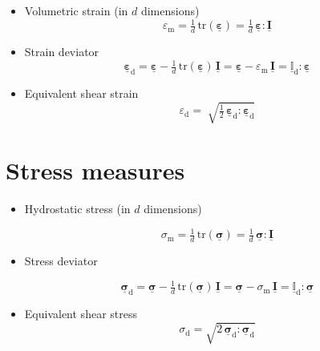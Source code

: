 \documentclass[namecite, fleqn]{goose-article}
\newcommand\T[1]{\underline{\bm{{#1}}}}
\newcommand\TT[1]{\underline{\mathbb{{#1}}}}
\begin{document}
\begin{itemize}

    \item Volumetric strain (in $d$ dimensions)
    \begin{equation}
        \varepsilon_\mathrm{m}
        = \tfrac{1}{d} \, \mathrm{tr} ( \T{\varepsilon} )
        = \tfrac{1}{d} \, \T{\varepsilon} : \T{I}
    \end{equation}

    \item Strain deviator
    \begin{equation}
        \T{\varepsilon}_\mathrm{d}
        = \T{\varepsilon} - \tfrac{1}{d} \, \mathrm{tr} ( \T{\varepsilon} ) \, \T{I}
        = \T{\varepsilon} - \varepsilon_\mathrm{m} \, \T{I}
        = \TT{I}_\mathrm{d} : \T{\varepsilon}
    \end{equation}

    \item Equivalent shear strain
    \begin{equation}
        \varepsilon_\mathrm{d}
        = \; \sqrt{
          \tfrac{1}{2} \, \T{\varepsilon}_\mathrm{d} : \T{\varepsilon}_\mathrm{d}
        }
    \end{equation}

\end{itemize}

\section{Stress measures}
\label{sec:nomenclature::stress}

\begin{itemize}

    \item Hydrostatic stress (in $d$ dimensions)

    \begin{equation}
        \sigma_\mathrm{m}
        = \tfrac{1}{d} \, \mathrm{tr} ( \T{\sigma} )
        = \tfrac{1}{d} \, \T{\sigma} : \T{I}
    \end{equation}

    \item Stress deviator

    \begin{equation}
        \T{\sigma}_\mathrm{d}
        = \T{\sigma} - \tfrac{1}{d} \, \mathrm{tr} ( \T{\sigma} ) \, \T{I}
        = \T{\sigma} - \sigma_\mathrm{m} \, \T{I}
        = \TT{I}_\mathrm{d} : \T{\sigma}
    \end{equation}

    \item Equivalent shear stress
    \begin{equation}
        \sigma_\mathrm{d} = \sqrt{ 2 \, \T{\sigma}_\mathrm{d} : \T{\sigma}_\mathrm{d} }
    \end{equation}

\end{itemize}
\end{document}
